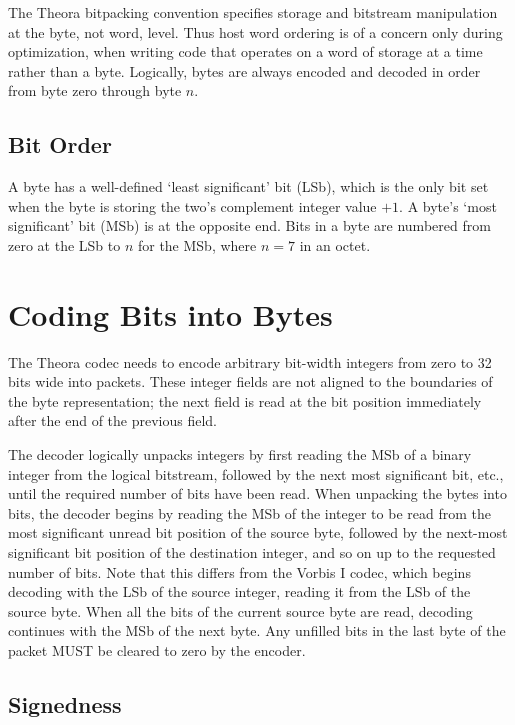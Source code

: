 \documentclass[11pt,letterpaper]{book}
\numberwithin{equation}{chapter}
\numberwithin{figure}{chapter}
\numberwithin{table}{chapter}
\begin{document}
The Theora bitpacking convention specifies storage and bitstream manipulation
 at the byte, not word, level.
Thus host word ordering is of a concern only during optimization, when writing
 code that operates on a word of storage at a time rather than a byte.
Logically, bytes are always encoded and decoded in order from byte zero through
 byte $n$.

\subsection{Bit Order}

A byte has a well-defined `least significant' bit (LSb), which is the only bit
 set when the byte is storing the two's complement integer value $+1$.
A byte's `most significant' bit (MSb) is at the opposite end.
Bits in a byte are numbered from zero at the LSb to $n$ for the MSb, where
 $n=7$ in an octet.

\section{Coding Bits into Bytes}

The Theora codec needs to encode arbitrary bit-width integers from zero to 32
 bits wide into packets.
These integer fields are not aligned to the boundaries of the byte
 representation; the next field is read at the bit position immediately
 after the end of the previous field.

The decoder logically unpacks integers by first reading the MSb of a binary
 integer from the logical bitstream, followed by the next most significant
 bit, etc., until the required number of bits have been read.
When unpacking the bytes into bits, the decoder begins by reading the MSb of
 the integer to be read from the most significant unread bit position of the
 source byte, followed by the next-most significant bit position of the
 destination integer, and so on up to the requested number of bits.
Note that this differs from the Vorbis I codec, which
 begins decoding with the LSb of the source integer, reading it from the
 LSb of the source byte.
When all the bits of the current source byte are read, decoding continues with
 the MSb of the next byte.
Any unfilled bits in the last byte of the packet MUST be cleared to zero by the
 encoder.

\subsection{Signedness}
\end{document}
